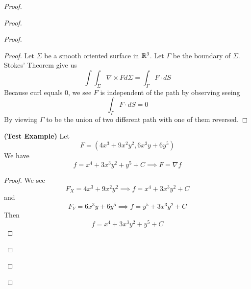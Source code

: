 \documentclass{report}
\begin{document}
\begin{proof}
\begin{proof}
\begin{proof}
\begin{proof}
Let $\Sigma$ be a smooth oriented surface in  $\mathbb{R}^3$. Let  $\Gamma$ be the boundary of  $\Sigma$. Stokes' Theorem give us
 \begin{equation}
\int \int_{\Sigma} \nabla \times F d\Sigma =\int_{\Gamma} F\cdot dS
\end{equation}
Because curl equals $0$, we see  $F$ is independent of the path by observing seeing 
 \begin{equation}
\int_{\Gamma} F\cdot dS=0
\end{equation}
By viewing $\Gamma$ to be the union of two different path with one of them reversed. 
\end{proof}
\begin{theorem}
\label{7.2.9}
\textbf{(Test Example)} Let
\begin{equation}
F=(4x^3+9x^2y^2,6x^3y+6y^5)
\end{equation}
We have
\begin{equation}
f=x^4+3x^3y^2+y^5+C\implies F=\nabla f
\end{equation}
\end{theorem}
\begin{proof}
We see 
\begin{equation}
F_X=4x^3+9x^2y^2 \implies f=x^4+3x^3y^2+C
\end{equation}
and
\begin{equation}
F_Y=6x^3y+6y^5\implies f=y^5+3x^3y^2+C
\end{equation}
Then 
\begin{equation}
f=x^4+3x^3y^2+y^5+C
\end{equation}
\end{proof}

\end{proof}
\end{proof}
\end{proof}
\end{document}

